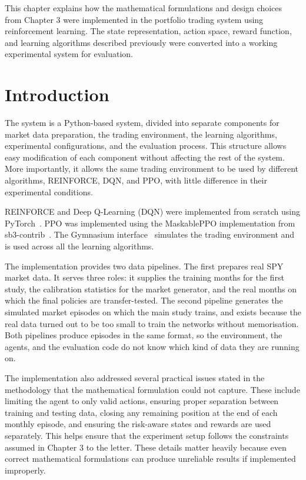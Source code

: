 This chapter explains how the mathematical formulations and design
choices from Chapter 3 were implemented in the portfolio trading system
using reinforcement learning. The state representation, action space,
reward function, and learning algorithms described previously were
converted into a working experimental system for evaluation.

\section{Introduction}

The system is a Python-based system, divided into separate components
for market data preparation, the trading environment, the learning
algorithms, experimental configurations, and the evaluation process.
This structure allows easy modification of each component without
affecting the rest of the system. More importantly, it allows the same
trading environment to be used by different algorithms, REINFORCE, DQN,
and PPO, with little difference in their experimental conditions.

REINFORCE and Deep Q-Learning (DQN) were implemented from scratch using
PyTorch~\cite{paszke2019}. PPO was implemented using the MaskablePPO implementation from
sb3-contrib~\cite{raffin2021sb3}. The Gymnasium interface~\cite{towers2024gymnasium} simulates the trading environment
and is used across all the learning algorithms.

The implementation provides two data pipelines. The first prepares real
SPY market data. It serves three roles: it supplies the training months
for the first study, the calibration statistics for the market
generator, and the real months on which the final policies are
transfer-tested.
The second pipeline generates the simulated market episodes on which the
main study trains, and exists because the real data turned out to be too
small to train the networks without memorisation. Both pipelines produce
episodes in the same format, so the environment, the agents, and the
evaluation code do not know which kind of data they are running on.

The implementation also addressed several practical issues stated in the
methodology that the mathematical formulation could not capture. These
include limiting the agent to only valid actions, ensuring proper
separation between training and testing data, closing any remaining
position at the end of each monthly episode, and ensuring the risk-aware
states and rewards are used separately. This helps ensure that the
experiment setup follows the constraints assumed in Chapter 3 to the
letter. These details matter heavily because even correct mathematical
formulations can produce unreliable results if implemented improperly.

